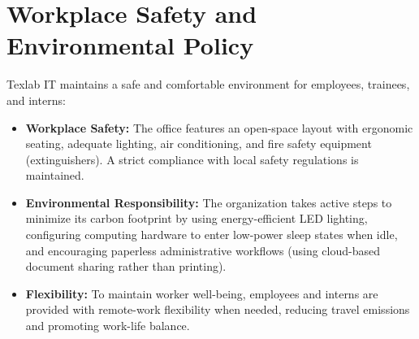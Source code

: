 \section{Workplace Safety and Environmental Policy}
Texlab IT maintains a safe and comfortable environment for employees, trainees, and interns:
\begin{itemize}
    \item \textbf{Workplace Safety:} The office features an open-space layout with ergonomic seating, adequate lighting, air conditioning, and fire safety equipment (extinguishers). A strict compliance with local safety regulations is maintained.
    \item \textbf{Environmental Responsibility:} The organization takes active steps to minimize its carbon footprint by using energy-efficient LED lighting, configuring computing hardware to enter low-power sleep states when idle, and encouraging paperless administrative workflows (using cloud-based document sharing rather than printing).
    \item \textbf{Flexibility:} To maintain worker well-being, employees and interns are provided with remote-work flexibility when needed, reducing travel emissions and promoting work-life balance.
\end{itemize}
